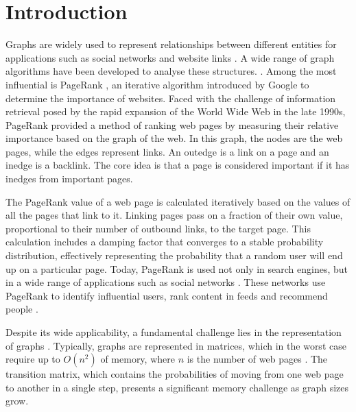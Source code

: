 \section{Introduction}
Graphs are widely used to represent relationships between different entities for applications such as social networks and website links \cite{zhang_distributed_2021}. 
A wide range of graph algorithms have been developed to analyse these structures. \cite{malewicz_pregel_2010}\cite{low_distributed_2012}\cite{koch_empirical_2016}. Among the most influential is PageRank \cite{page_pagerank_1999}, an iterative algorithm introduced by Google to determine the importance of websites. Faced with the challenge of information retrieval posed by the rapid expansion of the World Wide Web in the late 1990s, PageRank provided a method of ranking web pages by measuring their relative importance based on the graph of the web. In this graph, the nodes are the web pages, while the edges represent links. An outedge is a link on a page and an inedge is a backlink. The core idea is that a page is considered important if it has inedges from important pages.\par
The PageRank value of a web page is calculated iteratively based on the values of all the pages that link to it. Linking pages pass on a fraction of their own value, proportional to their number of outbound links, to the target page. This calculation includes a damping factor that converges to a stable probability distribution, effectively representing the probability that a random user will end up on a particular page.
Today, PageRank is used not only in search engines, but in a wide range of applications such as social networks \cite{wu_efficient_2024}. These networks use PageRank to identify influential users, rank content in feeds and recommend people \cite{weng_twitterrank_2010}.\par
Despite its wide applicability, a fundamental challenge lies in the representation of graphs \cite{liu_fast_2015}. Typically, graphs are represented in matrices, which in the worst case require up to $O(n^2)$ of memory, where $n$ is the number of web pages \cite{wu_efficient_2024}. The transition matrix, which contains the probabilities of moving from one web page to another in a single step, presents a significant memory challenge as graph sizes grow.\par

